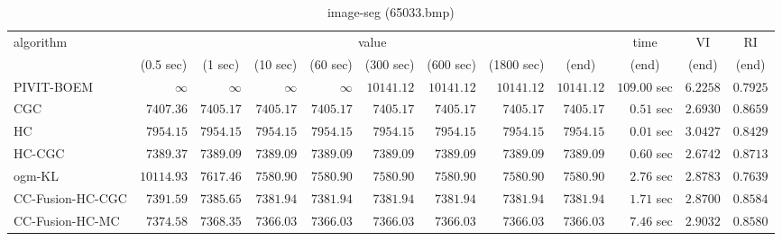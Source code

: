 \begin{table}[H]
\scriptsize
\centering
\caption{image-seg (65033.bmp)}
\label{tab:anytimetable-image-seg-65033.bmp}
\begin{tabular}{lrrrrrrrrrrr}
\toprule
           algorithm &                                   \multicolumn{8}{c}{value} & \multicolumn{1}{c}{time}    & \multicolumn{1}{c}{VI}  & \multicolumn{1}{c}{RI} \\  
\cmidrule(lr){2-9}\cmidrule(lr){10-10} \cmidrule(lr){11-11} \cmidrule(lr){12-12}   
                     & \multicolumn{1}{c}{(0.5 sec)} & \multicolumn{1}{c}{(1 sec)} & \multicolumn{1}{c}{(10 sec)} & \multicolumn{1}{c}{(60 sec)} & \multicolumn{1}{c}{(300 sec)} & \multicolumn{1}{c}{(600 sec)} & \multicolumn{1}{c}{(1800 sec)} & \multicolumn{1}{c}{(end)} & \multicolumn{1}{c}{(end)}    & \multicolumn{1}{c}{(end)}   & \multicolumn{1}{c}{(end)}  \\ \midrule 
          PIVIT-BOEM & $\infty$ & $\infty$ & $\infty$ & $\infty$ & $     10141.12$ & $     10141.12$ & $     10141.12$ & $     10141.12$ & $       109.00$ sec    & $       6.2258$  & $       0.7925$ \\ 
                 CGC & $      7407.36$ & $      7405.17$ & $      7405.17$ & $      7405.17$ & $      7405.17$ & $      7405.17$ & $      7405.17$ & $      7405.17$ & $         0.51$ sec    & $       2.6930$  & $       0.8659$ \\ 
                  HC & $      7954.15$ & $      7954.15$ & $      7954.15$ & $      7954.15$ & $      7954.15$ & $      7954.15$ & $      7954.15$ & $      7954.15$ & $         0.01$ sec    & $       3.0427$  & $       0.8429$ \\ 
              HC-CGC & $      7389.37$ & $      7389.09$ & $      7389.09$ & $      7389.09$ & $      7389.09$ & $      7389.09$ & $      7389.09$ & $      7389.09$ & $         0.60$ sec    & $       2.6742$  & $       0.8713$ \\ 
              ogm-KL & $     10114.93$ & $      7617.46$ & $      7580.90$ & $      7580.90$ & $      7580.90$ & $      7580.90$ & $      7580.90$ & $      7580.90$ & $         2.76$ sec    & $       2.8783$  & $       0.7639$ \\ 
    CC-Fusion-HC-CGC & $      7391.59$ & $      7385.65$ & $      7381.94$ & $      7381.94$ & $      7381.94$ & $      7381.94$ & $      7381.94$ & $      7381.94$ & $         1.71$ sec    & $       2.8700$  & $       0.8584$ \\ 
     CC-Fusion-HC-MC & $      7374.58$ & $      7368.35$ & $      7366.03$ & $      7366.03$ & $      7366.03$ & $      7366.03$ & $      7366.03$ & $      7366.03$ & $         7.46$ sec    & $       2.9032$  & $       0.8580$ \\ 

\end{tabular}
\end{table}
